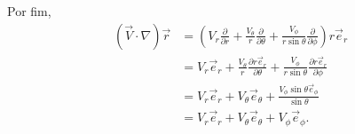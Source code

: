 \documentclass[a4paper,12pt, leqno, answers]{exam}
\newcommand{\devp}[2]{\frac{\partial #1}{\partial #2}}
\begin{document}
\begin{questions}
\begin{solution}
        Por fim,
        \begin{align*}
            \left( \vec{V} \cdot \nabla \right) \vec{r} &= \left( V_r \devp{}{r} + \frac{V_\theta}{r} \devp{}{\theta} + \frac{V_\phi}{r \sin \theta} \devp{}{\phi} \right) r \vec{e}_r \\
            &= V_r \vec{e}_r + \frac{V_\theta}{r} \devp{r \vec{e}_r}{\theta} + \frac{V_\phi}{r \sin \theta} \devp{r \vec{e}_r}{\phi} \\
            &= V_r \vec{e}_r + V_\theta \vec{e}_\theta + \frac{V_\phi \sin \theta \vec{e}_\phi}{\sin \theta} \\
            &= V_r \vec{e}_r + V_\theta \vec{e}_\theta + V_\phi \vec{e}_\phi.
        \end{align*}
    \end{solution}
\end{questions}
\end{document}
